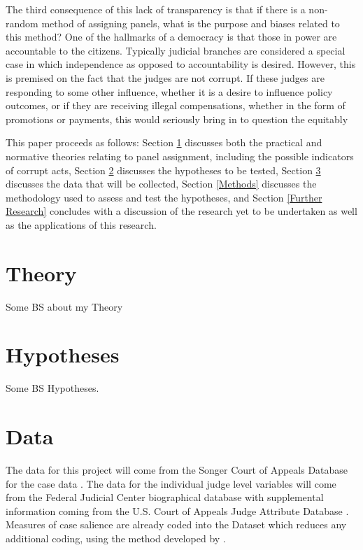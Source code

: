 \documentclass[12pt]{article}
\begin{document}
The third consequence of this lack of transparency is that if there is a non-random method of assigning panels, what is the purpose and biases related to this method?  One of the hallmarks of a democracy is that those in power are accountable to the citizens.  Typically judicial branches are considered a special case in which independence as opposed to accountability is desired.  However, this is premised on the fact that the judges are not corrupt.  If these judges are responding to some other influence, whether it is a desire to influence policy outcomes, or if they are receiving illegal compensations, whether in the form of promotions or payments, this would seriously bring in to question the equitably 

This paper proceeds as follows: Section \ref{Theory} discusses both the practical and normative theories relating to panel assignment, including the possible indicators of corrupt acts, Section \ref{Hypotheses} discusses the hypotheses to be tested, Section \ref{Data} discusses the data that will be collected, Section \ref{Methods} discusses the methodology used to assess and test the hypotheses, and Section \ref{Further Research} concludes with a discussion of the research yet to be undertaken as well as the applications of this research.

\section{Theory}\label{Theory}
Some BS about my Theory

\section{Hypotheses}\label{Hypotheses}
Some BS Hypotheses.

\section{Data}\label{Data}
The data for this project will come from the Songer Court of Appeals Database for the case data \citep{Songer2007}. The data for the individual judge level variables will come from the Federal Judicial Center biographical database with supplemental information coming from the U.S. Court of Appeals Judge Attribute Database \citep{FJC}. Measures of case salience are already coded into the \citeauthor{Songer2007} Dataset which reduces any additional coding, using the method developed by \cite{Hettinger2003}.
\end{document}

